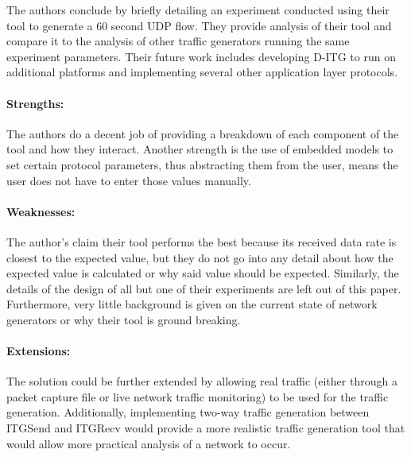 \documentclass[11pt]{article}
\begin{document}
The authors conclude by briefly detailing an experiment conducted using their tool to generate a 60 second UDP flow.  They provide analysis of their tool and compare it to the analysis of other traffic generators running the same experiment parameters.  Their future work includes developing D-ITG to run on additional platforms and implementing several other application layer protocols. 

\paragraph{Strengths:}  The authors do a decent job of providing a breakdown of each component of the tool and how they interact.  Another strength is the use of embedded models to set certain protocol parameters, thus abstracting them from the user, means the user does not have to enter those values manually. 

\paragraph{Weaknesses:}  The author's claim their tool performs the best because its received data rate is closest to the expected value, but they do not go into any detail about how the expected value is calculated or why said value should be expected.  Similarly, the details of the design of all but one of their experiments are left out of this paper.  Furthermore, very little background is given on the current state of network generators or why their tool is ground breaking.

\paragraph{Extensions:}  The solution could be further extended by allowing real traffic (either through a packet capture file or live network traffic monitoring) to be used for the traffic generation.  Additionally, implementing two-way traffic generation between ITGSend and ITGRecv would provide a more realistic traffic generation tool that would allow more practical analysis of a network to occur. 


\newpage
{}

\end{document}
